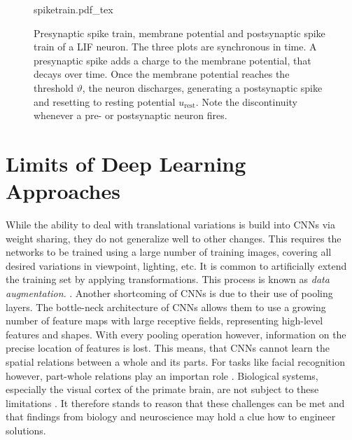 \begin{figure}
    \centering
\def\svgwidth{.8\textwidth}
{spiketrain.pdf_tex}
\caption[Presynaptic spike train, membrane potential and postsynaptic spike train of a LIF neuron]{Presynaptic spike train, membrane potential and postsynaptic spike train of a LIF neuron. The three plots are synchronous in time. A presynaptic spike adds a charge to the membrane potential, that decays over time. Once the membrane potential reaches the threshold $\vartheta$, the neuron discharges, generating a postsynaptic spike and resetting to resting potential $u_\mathrm{rest}$. Note the discontinuity whenever a pre- or postsynaptic neuron fires.}\label{fig:spiketrain}
\end{figure}\noindent
\section{Limits of Deep Learning Approaches}
While the ability to deal with translational variations is build into CNNs via weight sharing, they do not generalize well to other changes. This requires the networks to be trained using a large number of training images, covering all desired variations in viewpoint, lighting, etc. It is common to artificially extend the training set by applying transformations. This process is known as \emph{data augmentation}.  \cite{wong2016understanding,perez2017effectiveness}. Another shortcoming of CNNs is due to their use of pooling layers. The bottle-neck architecture of CNNs allows them to use a growing number of feature maps with large receptive fields, representing high-level features and shapes. With every pooling operation however, information on the precise location of features is lost. This means, that CNNs cannot learn the spatial relations between a whole and its parts. For tasks like facial recognition however, part-whole relations play an importan role \cite{tanaka2016parts}. Biological systems, especially the visual cortex of the primate brain, are not subject to these limitations \cite{stone2018rotation,isbister2018new}. It therefore stands to reason that these challenges can be met and that findings from biology and neuroscience may hold a clue how to engineer solutions.